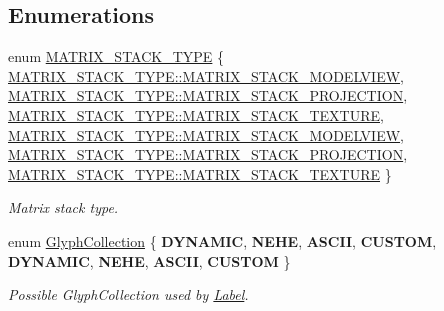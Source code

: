 \subsection*{Enumerations}
\begin{DoxyCompactItemize}
\item 
enum \hyperlink{group__base_ga4d146cef7130a8f3a953d46964ea3905}{M\+A\+T\+R\+I\+X\+\_\+\+S\+T\+A\+C\+K\+\_\+\+T\+Y\+PE} \{ \newline
\hyperlink{group__base_gga4d146cef7130a8f3a953d46964ea3905a2c38cdb8eb5928738bbcda4e5f085920}{M\+A\+T\+R\+I\+X\+\_\+\+S\+T\+A\+C\+K\+\_\+\+T\+Y\+P\+E\+::\+M\+A\+T\+R\+I\+X\+\_\+\+S\+T\+A\+C\+K\+\_\+\+M\+O\+D\+E\+L\+V\+I\+EW}, 
\hyperlink{group__base_gga4d146cef7130a8f3a953d46964ea3905aad1cc2649728ae11b69b747a58845764}{M\+A\+T\+R\+I\+X\+\_\+\+S\+T\+A\+C\+K\+\_\+\+T\+Y\+P\+E\+::\+M\+A\+T\+R\+I\+X\+\_\+\+S\+T\+A\+C\+K\+\_\+\+P\+R\+O\+J\+E\+C\+T\+I\+ON}, 
\hyperlink{group__base_gga4d146cef7130a8f3a953d46964ea3905a34b60a12b3b0826d198a5f18ef4f48c8}{M\+A\+T\+R\+I\+X\+\_\+\+S\+T\+A\+C\+K\+\_\+\+T\+Y\+P\+E\+::\+M\+A\+T\+R\+I\+X\+\_\+\+S\+T\+A\+C\+K\+\_\+\+T\+E\+X\+T\+U\+RE}, 
\hyperlink{group__base_gga4d146cef7130a8f3a953d46964ea3905a2c38cdb8eb5928738bbcda4e5f085920}{M\+A\+T\+R\+I\+X\+\_\+\+S\+T\+A\+C\+K\+\_\+\+T\+Y\+P\+E\+::\+M\+A\+T\+R\+I\+X\+\_\+\+S\+T\+A\+C\+K\+\_\+\+M\+O\+D\+E\+L\+V\+I\+EW}, 
\newline
\hyperlink{group__base_gga4d146cef7130a8f3a953d46964ea3905aad1cc2649728ae11b69b747a58845764}{M\+A\+T\+R\+I\+X\+\_\+\+S\+T\+A\+C\+K\+\_\+\+T\+Y\+P\+E\+::\+M\+A\+T\+R\+I\+X\+\_\+\+S\+T\+A\+C\+K\+\_\+\+P\+R\+O\+J\+E\+C\+T\+I\+ON}, 
\hyperlink{group__base_gga4d146cef7130a8f3a953d46964ea3905a34b60a12b3b0826d198a5f18ef4f48c8}{M\+A\+T\+R\+I\+X\+\_\+\+S\+T\+A\+C\+K\+\_\+\+T\+Y\+P\+E\+::\+M\+A\+T\+R\+I\+X\+\_\+\+S\+T\+A\+C\+K\+\_\+\+T\+E\+X\+T\+U\+RE}
 \}\begin{DoxyCompactList}\small\item\em Matrix stack type. \end{DoxyCompactList}
\item 
enum \hyperlink{group__base_gac5e83e2fc436edc7833f2bcabad984f3}{Glyph\+Collection} \{ \newline
{\bfseries D\+Y\+N\+A\+M\+IC}, 
{\bfseries N\+E\+HE}, 
{\bfseries A\+S\+C\+II}, 
{\bfseries C\+U\+S\+T\+OM}, 
\newline
{\bfseries D\+Y\+N\+A\+M\+IC}, 
{\bfseries N\+E\+HE}, 
{\bfseries A\+S\+C\+II}, 
{\bfseries C\+U\+S\+T\+OM}
 \}\begin{DoxyCompactList}\small\item\em Possible Glyph\+Collection used by \hyperlink{classLabel}{Label}. \end{DoxyCompactList}

\end{DoxyCompactItemize}
